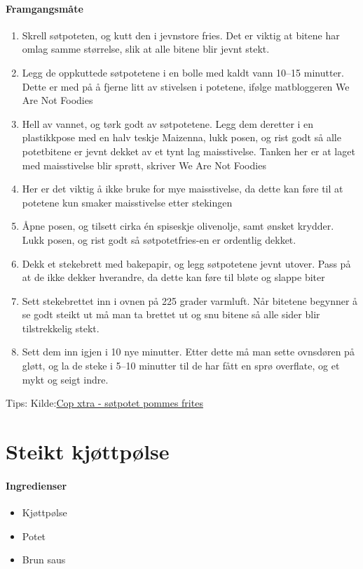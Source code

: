 \documentclass[12pt,a4paper]{book}
\begin{document}
\paragraph{Framgangsmåte}
\begin{enumerate}[noitemsep]
	\item Skrell søtpoteten, og kutt den i jevnstore fries. Det er viktig at bitene har omlag samme størrelse, slik at alle bitene blir jevnt stekt.
	\item Legg de oppkuttede søtpotetene i en bolle med kaldt vann 10--15 minutter. Dette er med på å fjerne litt av stivelsen i potetene, ifølge matbloggeren We Are Not Foodies
	\item Hell av vannet, og tørk godt av søtpotetene. Legg dem deretter i en plastikkpose med en halv teskje Maizenna, lukk posen, og rist godt så alle potetbitene er jevnt dekket av et tynt lag maisstivelse. Tanken her er at laget med maisstivelse blir sprøtt, skriver We Are Not Foodies
	\item Her er det viktig å ikke bruke for mye maisstivelse, da dette kan føre til at potetene kun smaker maisstivelse etter stekingen
	\item Åpne posen, og tilsett cirka én spiseskje olivenolje, samt ønsket krydder. Lukk posen, og rist godt så søtpotetfries-en er ordentlig dekket.
	\item Dekk et stekebrett med bakepapir, og legg søtpotetene jevnt utover. Pass på at de ikke dekker hverandre, da dette kan føre til bløte og slappe biter
	\item Sett stekebrettet inn i ovnen på 225 grader varmluft. Når bitetene begynner å se godt steikt ut må man ta brettet ut og snu bitene så alle sider blir tilstrekkelig stekt.
	\item Sett dem inn igjen i 10 nye minutter. Etter dette må man sette ovnsdøren på gløtt, og la de steke i 5--10 minutter til de har fått en sprø overflate, og et mykt og seigt indre.

\end{enumerate}

Tips:
Kilde:\href{https://coop.no/extra/mat--trender/garantert-spro-sotpotetfries/}{Cop xtra - søtpotet pommes frites}
\clearpage{}
\clearpage{}\section{﻿Steikt kjøttpølse}


\paragraph{Ingredienser}
\begin{itemize}[noitemsep]
	\item Kjøttpølse
	\item Potet
	\item Brun saus
\end{itemize}
\end{document}
